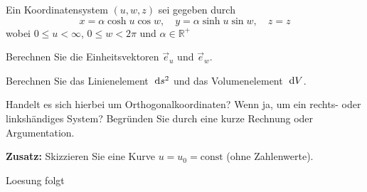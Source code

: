 \documentclass{atistandalonetask}
\begin{document}
  \begin{atiTask}[
    title = Koordinatentransformation
  ]
  Ein Koordinatensystem $(u,w,z)$ sei gegeben durch
  \[
  x=\alpha\cosh u\cos w,\quad y=\alpha \sinh u \sin w,\quad z=z
  \]
  wobei $0\leq u< \infty$, $0\leq w<2\pi$ und $\alpha \in \mathbb{R^+}$
  
 \begin{atiSubtasks}
 \item Berechnen Sie die Einheitsvektoren $\vec{e}_u$ und $\vec{e}_w$. 
 \item Berechnen Sie das Linienelement $\;\mathrm{d} s^2$ und das Volumenelement $\;\mathrm{d} V$.
 \item Handelt es sich hierbei um Orthogonalkoordinaten? Wenn ja, um ein rechts- oder linkshändiges System? Begründen Sie durch eine kurze Rechnung oder Argumentation.
 \item \textbf{Zusatz:} Skizzieren Sie eine Kurve $u=u_0=\text{const}$ (ohne Zahlenwerte).
 \end{atiSubtasks}	
  \end{atiTask}
  \begin{atiSolution}
Loesung folgt
  \end{atiSolution}
\end{document}
